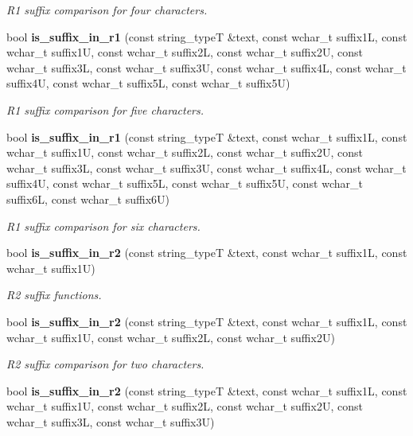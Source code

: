 \begin{DoxyCompactItemize}
\begin{DoxyCompactList}\small\item\em R1 suffix comparison for four characters. \end{DoxyCompactList}\item 
bool {\bf is\+\_\+suffix\+\_\+in\+\_\+r1} (const string\+\_\+typeT \&text, const wchar\+\_\+t suffix1L, const wchar\+\_\+t suffix1U, const wchar\+\_\+t suffix2L, const wchar\+\_\+t suffix2U, const wchar\+\_\+t suffix3L, const wchar\+\_\+t suffix3U, const wchar\+\_\+t suffix4L, const wchar\+\_\+t suffix4U, const wchar\+\_\+t suffix5L, const wchar\+\_\+t suffix5U)\label{classstemming_1_1stem_a88f0e5e0cc055f013b6321215eb18ef3}

\begin{DoxyCompactList}\small\item\em R1 suffix comparison for five characters. \end{DoxyCompactList}\item 
bool {\bf is\+\_\+suffix\+\_\+in\+\_\+r1} (const string\+\_\+typeT \&text, const wchar\+\_\+t suffix1L, const wchar\+\_\+t suffix1U, const wchar\+\_\+t suffix2L, const wchar\+\_\+t suffix2U, const wchar\+\_\+t suffix3L, const wchar\+\_\+t suffix3U, const wchar\+\_\+t suffix4L, const wchar\+\_\+t suffix4U, const wchar\+\_\+t suffix5L, const wchar\+\_\+t suffix5U, const wchar\+\_\+t suffix6L, const wchar\+\_\+t suffix6U)\label{classstemming_1_1stem_a19c2ee5166c7a9c81160408438c1f9a0}

\begin{DoxyCompactList}\small\item\em R1 suffix comparison for six characters. \end{DoxyCompactList}\item 
bool {\bf is\+\_\+suffix\+\_\+in\+\_\+r2} (const string\+\_\+typeT \&text, const wchar\+\_\+t suffix1L, const wchar\+\_\+t suffix1U)
\begin{DoxyCompactList}\small\item\em R2 suffix functions. \end{DoxyCompactList}\item 
bool {\bf is\+\_\+suffix\+\_\+in\+\_\+r2} (const string\+\_\+typeT \&text, const wchar\+\_\+t suffix1L, const wchar\+\_\+t suffix1U, const wchar\+\_\+t suffix2L, const wchar\+\_\+t suffix2U)\label{classstemming_1_1stem_a8325bde2b5c8d5676d2b8e2b822b29a4}

\begin{DoxyCompactList}\small\item\em R2 suffix comparison for two characters. \end{DoxyCompactList}\item 
bool {\bf is\+\_\+suffix\+\_\+in\+\_\+r2} (const string\+\_\+typeT \&text, const wchar\+\_\+t suffix1L, const wchar\+\_\+t suffix1U, const wchar\+\_\+t suffix2L, const wchar\+\_\+t suffix2U, const wchar\+\_\+t suffix3L, const wchar\+\_\+t suffix3U)\label{classstemming_1_1stem_ab5c71d01e3285eec2e79521c1b76f79d}


\end{DoxyCompactItemize}
